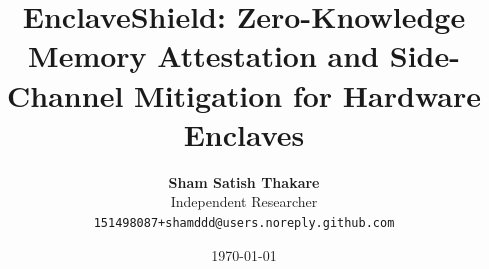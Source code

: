 \documentclass[10pt,twocolumn,letterpaper]{article}
\title{\textbf{EnclaveShield: Zero-Knowledge Memory Attestation and Side-Channel Mitigation for Hardware Enclaves}}
\author{
\textbf{Sham Satish Thakare}\\
Independent Researcher\\
{\tt\small 151498087+shamddd@users.noreply.github.com}
}
\date{\today}
\begin{document}
\maketitle

\begin{abstract}

\end{abstract}












\end{document}
